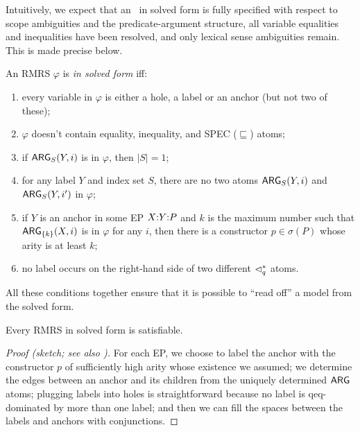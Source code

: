 Intuitively, we expect that an \rmrs\ in solved form is fully
specified with respect to scope ambiguities and the predicate-argument
structure, all variable equalities and inequalities have been
resolved, and only lexical sense ambiguities remain.  This is made
precise below.


\begin{definition}\label{defn:solved-forms}
  An RMRS $\varphi$ is \emph{in solved form} iff:
  \begin{enumerate}
  \item every variable in $\varphi$ is either a hole, a label or an
    anchor (but not two of these);
  \item $\varphi$ doesn't contain equality, inequality, and SPEC
    ($\sqsubseteq$) atoms;
  \item if $\mathsf{ARG}_S(Y,i)$ is in $\varphi$, then $|S| = 1$;
  \item for any label $Y$ and index set $S$, there
    are no two atoms $\mathsf{ARG}_S(Y,i)$ and $\mathsf{ARG}_S(Y,i')$ in $\varphi$;
  \item if $Y$ is an anchor in some EP $X {:} Y {:} P$ and $k$ is the
    maximum number such that $\mathsf{ARG}_{\{k\}}(X,i)$ is in $\varphi$ for
    any $i$, then there is a constructor $p \in \sigma(P)$ whose arity
    is at least $k$;
  \item no label occurs on the right-hand side of two
    different $\lhd^*_q$ atoms.
  \end{enumerate}
\end{definition}


All these conditions together ensure that it is possible to ``read
off'' a model from the solved form.


\begin{prop}
  Every RMRS in solved form is satisfiable.
\end{prop}
\begin{proof}[Proof (sketch; see also
  \cite{Duchier00dominanceconstraints})] 
  For each EP, we choose to label the anchor with the constructor $p$
  of sufficiently high arity whose existence we assumed; we determine
  the edges between an anchor and its children from the uniquely
  determined $\mathsf{ARG}$ atoms; plugging labels into holes is
  straightforward because no label is qeq-dominated by more than one
  label; and then we can fill the spaces between the labels and
  anchors with conjunctions.
\end{proof}




